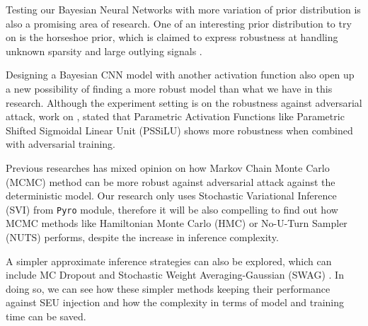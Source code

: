 \documentclass[ %
                    author={Revalda Putawara},
                supervisor={Dr. James Pope},
                    degree={MSc},
                     title={Robustness of Bayesian Neural Networks Design Choices Against Weight and Bias Perturbation Induced by Single Event Upsets (SEUs)},
                      type={},
                      year={2025}]{dissertation}
\begin{document}
Testing our Bayesian Neural Networks with more variation of prior distribution is also a promising area of research. One of an interesting prior distribution to try on is the horseshoe prior, which is claimed to express robustness at handling unknown sparsity and large outlying signals \cite{horseshoecarvalho}.

Designing a Bayesian CNN model with another activation function also open up a new possibility of finding a more robust model than what we have in this research. Although the experiment setting is on the robustness against adversarial attack, work on \cite{pssilu}, stated that Parametric Activation Functions like Parametric Shifted Sigmoidal Linear Unit (PSSiLU) shows more robustness when combined with adversarial training.

Previous researches has mixed opinion on how Markov Chain Monte Carlo (MCMC) method can be more robust against adversarial attack against the deterministic model. Our research only uses Stochastic Variational Inference (SVI) from \texttt{Pyro} module, therefore it will be also compelling to find out how MCMC methods like Hamiltonian Monte Carlo (HMC) or No-U-Turn Sampler (NUTS) \cite{homanNUTS} performs, despite the increase in inference complexity.

A simpler approximate inference strategies can also be explored, which can include MC Dropout \cite{mcdropout} and Stochastic Weight Averaging-Gaussian (SWAG) \cite{swag}. In doing so, we can see how these simpler methods keeping their performance against SEU injection and how the complexity in terms of model and  training time can be saved.






%
%
\end{document}
